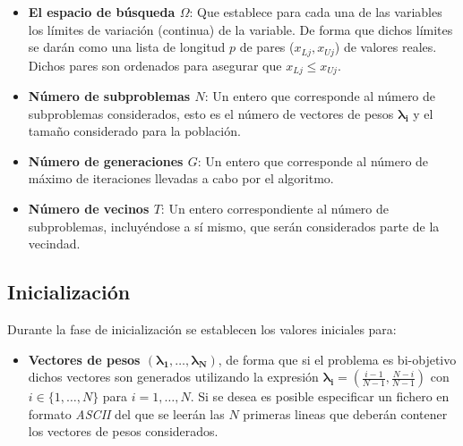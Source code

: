 \noindent\begin{minipage}[H]{0.5\linewidth}
\begin{itemize}
    \item \textbf{El espacio de búsqueda $\Omega$}: Que establece para cada una de las variables los límites de variación (continua) de la variable. De forma que dichos límites se darán como una lista de longitud $p$ de pares ($x_{Lj}, x_{Uj}$) de valores reales. Dichos pares son ordenados para asegurar que $x_{Lj} \leq x_{Uj}$.\\
     
     \item \textbf{Número de subproblemas $N$}: Un entero que corresponde al número de subproblemas considerados, esto es el número de vectores de pesos $\boldsymbol{\lambda_i}$ y el tamaño considerado para la población.\\
     
     \item \textbf{Número de generaciones $G$}:  Un entero que corresponde al número de máximo de iteraciones llevadas a cabo por el algoritmo.\\
    
    \item \textbf{Número de vecinos $T$}: Un entero correspondiente al número de subproblemas, incluyéndose a sí mismo, que serán considerados parte de la vecindad.\\
    
\end{itemize} 




\subsection{Inicialización}

Durante la fase de inicialización se establecen los valores iniciales para:\\

\begin{itemize}
\item\textbf{ Vectores de pesos $(\boldsymbol{\lambda_1}, \dots, \boldsymbol{\lambda_N})$}, de forma que si el problema es bi-objetivo dichos vectores son generados utilizando la expresión $\boldsymbol{\lambda_i} = \left(\frac{i-1}{N-1}, \frac{N-i}{N-1} \right)$ con $i \in \{1, \dots, N\}$ para $i=1,\dots, N$. Si se desea es posible especificar un fichero en formato \textit{ASCII} del que se leerán las $N$ primeras lineas que deberán contener los vectores de pesos considerados.\\

\end{itemize}

\end{minipage} \hfill
